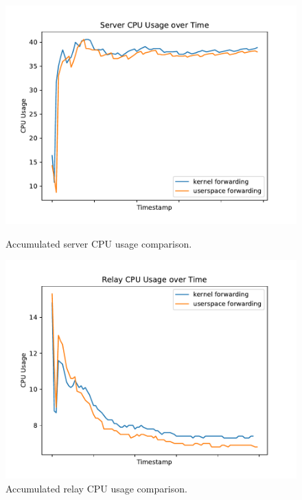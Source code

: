 \begin{figure}[H]
    \begin{minipage}{0.48\textwidth}
        \centering
        \includegraphics[width=1\linewidth]{figures/04_testing_and_results/cpu_usage_server_ns.pdf}
        \caption[Server CPU usage comparison]{Accumulated server CPU usage comparison.}\label{fig:cpu-utilization-server}
    \end{minipage}\hfill
    \begin{minipage}{0.48\textwidth}
        \centering
        \includegraphics[width=1\linewidth]{figures/04_testing_and_results/cpu_usage_relay_ns.pdf}
        \caption[Relay CPU usage comparison]{Accumulated relay CPU usage comparison.}\label{fig:cpu-utilization-relay}

\end{minipage}
\end{figure}
